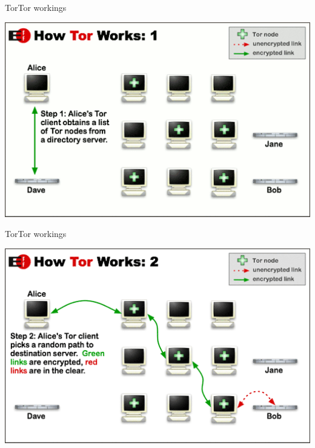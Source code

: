 

\begin{frame}{Tor}{Tor workings}
\begin{center}
\includegraphics[scale=0.54]{imgs/tor1.png}
\end{center}
\end{frame}

\begin{frame}{Tor}{Tor workings}
\begin{center}
\includegraphics[scale=0.54]{imgs/tor2.png}
\end{center}
\end{frame}

